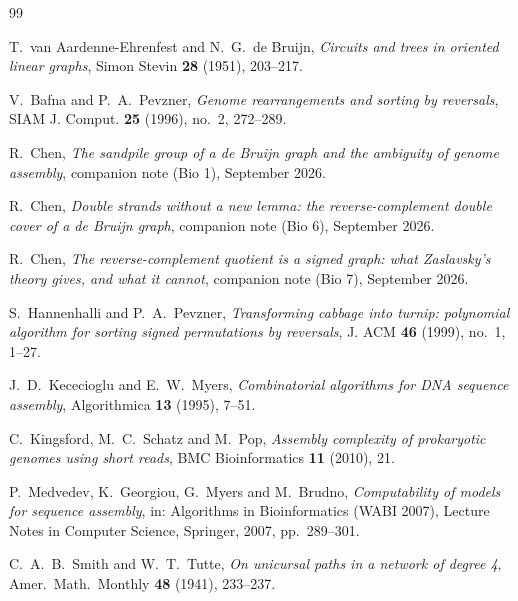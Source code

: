 \documentclass[11pt]{article}
\theoremstyle{plain}
\theoremstyle{definition}
\theoremstyle{remark}
\begin{document}
\begin{thebibliography}{99}

 T.~van Aardenne-Ehrenfest and N.~G.~de Bruijn,
\emph{Circuits and trees in oriented linear graphs},
Simon Stevin \textbf{28} (1951), 203--217.

 V.~Bafna and P.~A.~Pevzner,
\emph{Genome rearrangements and sorting by reversals},
SIAM J. Comput. \textbf{25} (1996), no.~2, 272--289.

 R.~Chen, \emph{The sandpile group of a de Bruijn graph and the ambiguity of
genome assembly}, companion note (Bio 1), September 2026.

 R.~Chen, \emph{Double strands without a new lemma: the reverse-complement
double cover of a de Bruijn graph}, companion note (Bio 6), September 2026.

 R.~Chen, \emph{The reverse-complement quotient is a signed graph: what
Zaslavsky's theory gives, and what it cannot}, companion note (Bio 7), September 2026.

 S.~Hannenhalli and P.~A.~Pevzner,
\emph{Transforming cabbage into turnip: polynomial algorithm for sorting signed permutations
by reversals}, J. ACM \textbf{46} (1999), no.~1, 1--27.

 J.~D.~Kececioglu and E.~W.~Myers,
\emph{Combinatorial algorithms for DNA sequence assembly},
Algorithmica \textbf{13} (1995), 7--51.

 C.~Kingsford, M.~C.~Schatz and M.~Pop,
\emph{Assembly complexity of prokaryotic genomes using short reads},
BMC Bioinformatics \textbf{11} (2010), 21.

 P.~Medvedev, K.~Georgiou, G.~Myers and M.~Brudno,
\emph{Computability of models for sequence assembly},
in: Algorithms in Bioinformatics (WABI 2007), Lecture Notes in Computer Science, Springer,
2007, pp.~289--301.

 C.~A.~B.~Smith and W.~T.~Tutte,
\emph{On unicursal paths in a network of degree 4},
Amer.\ Math.\ Monthly \textbf{48} (1941), 233--237.

\end{thebibliography}
\end{document}
